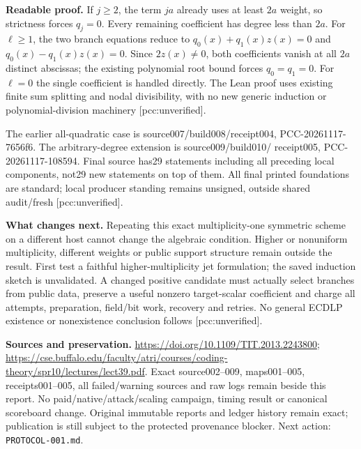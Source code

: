 \documentclass[10pt]{article}
\begin{document}
\textbf{Readable proof.} If $j\ge2$, the term $ja$ already uses at least
$2a$ weight, so strictness forces $q_j=0$. Every remaining coefficient has
degree less than $2a$. For $\ell\ge1$, the two branch equations reduce to
$q_0(x)+q_1(x)z(x)=0$ and $q_0(x)-q_1(x)z(x)=0$.
Since $2z(x)\ne0$, both coefficients vanish at all $2a$ distinct abscissas;
the existing polynomial root bound forces $q_0=q_1=0$. For $\ell=0$ the
single coefficient is handled directly. The Lean proof uses existing finite
sum splitting and nodal divisibility, with no new generic induction or
polynomial-division machinery [pcc:unverified].

The earlier all-quadratic case is source007/build008/receipt004,
PCC-20261117-7656f6. The arbitrary-degree extension is source009/build010/
receipt005, PCC-20261117-108594. Final source has29 statements including all
preceding local components, not29 new statements on top of them. All final
printed foundations are standard; local producer standing remains unsigned,
outside shared audit/fresh [pcc:unverified].

\textbf{What changes next.} Repeating this exact multiplicity-one symmetric
scheme on a different host cannot change the algebraic condition.
Higher or nonuniform multiplicity, different weights or public support
structure remain outside the result. First test a faithful higher-multiplicity
jet formulation; the saved induction sketch is unvalidated. A changed positive
candidate must actually select branches from public data, preserve a useful
nonzero target-scalar coefficient and charge all attempts, preparation,
field/bit work, recovery and retries. No general ECDLP existence or
nonexistence conclusion follows [pcc:unverified].

\textbf{Sources and preservation.}
\url{https://doi.org/10.1109/TIT.2013.2243800};
\url{https://cse.buffalo.edu/faculty/atri/courses/coding-theory/spr10/lectures/lect39.pdf}.
Exact source002--009, maps001--005, receipts001--005, all failed/warning
sources and raw logs remain beside this report. No paid/native/attack/scaling
campaign, timing result or canonical scoreboard change. Original immutable
reports and ledger history remain exact; publication is still subject to the
protected provenance blocker. Next action: \texttt{PROTOCOL-001.md}.
\end{document}
